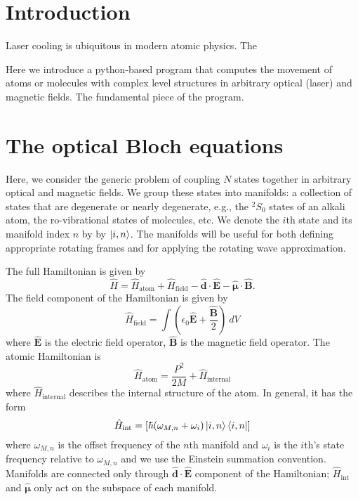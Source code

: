 \documentclass[final,5p,times,twocolumn]{elsarticle}
\begin{document}
\section{Introduction}
\label{sec:intro}
Laser cooling is ubiquitous in modern atomic physics.  The 

Here we introduce a python-based program that computes the movement of atoms or molecules with complex level structures in arbitrary optical (laser) and magnetic fields.  The fundamental piece of the program.

\section{The optical Bloch equations}
Here, we consider the generic problem of coupling $N$ states together in arbitrary optical and magnetic fields.
We group these states into manifolds: a collection of states that are degenerate or nearly degenerate, e.g., the $^2S_0$ states of an alkali atom, the ro-vibrational states of molecules, etc.
We denote the $i$th state and its manifold index $n$ by by $\ket{i, n}$.
The manifolds will be useful for both defining appropriate rotating frames and for applying the rotating wave approximation.

The full Hamiltonian is given by
\begin{equation}
    \label{eq:obe:generic_hamiltonian}
    \hat{H} = \hat{H}_\text{atom} + \hat{H}_\text{field} -
    \hat{\boldsymbol{d}}\cdot\hat{\mathbf{E}} -
    \hat{\boldsymbol{\mu}}\cdot\hat{\mathbf{B}}.
\end{equation}
The field component of the Hamiltonian is given by
\begin{equation}
    \label{eq:obe:field}
    \hat{H}_\text{field} = \int \left(\epsilon_0 \hat{\mathbf{E}} +
    \frac{\hat{\mathbf{B}}}{2}\right)\ dV
\end{equation}
where $\hat{\mathbf{E}}$ is the electric field operator, $\hat{\mathbf{B}}$ is the magnetic field operator.
The atomic Hamiltonian is 
\begin{equation}
    \hat{H}_\text{atom} = \frac{P^2}{2M} + \hat{H}_\text{internal}
\end{equation}
where $\hat{H}_\text{internal}$ describes the internal structure of the atom.
In general, it has the form
\begin{equation}
	\hat{H}_\text{int} = \left[\hbar(\omega_{M,n} + \omega_i)\ket{i,n}\Bra{i, n}\right]
\end{equation}
where $\omega_{M,n}$ is the offset frequency of the $n$th manifold and $\omega_i$ is the $i$th's state frequency relative to $\omega_{M,n}$ and we use the Einstein summation convention.  Manifolds are connected only through $\hat{\mathbf{d}}\cdot\hat{\mathbf{E}}$ component of the Hamiltonian; $\hat{H}_\text{int}$ and $\hat{\boldsymbol{\mu}}$ only act on the subspace of each manifold.
\end{document}
